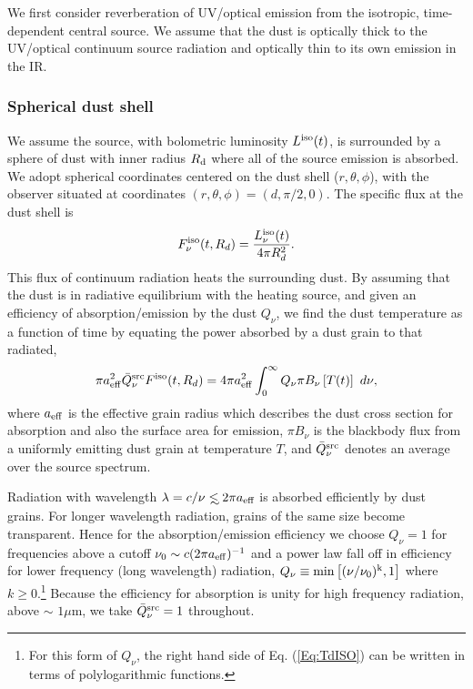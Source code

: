 We first consider reverberation of UV/optical emission from the isotropic,
time-dependent central source. We assume that the dust is optically thick to
the UV/optical continuum source radiation and optically thin to its own
emission in the IR.


\subsubsection{Spherical dust shell}

We assume the source, with bolometric luminosity $L^{\rm iso}(t)$, is
surrounded by a sphere of dust with inner radius $R_{\rm{d}}$ where all of the
source emission is absorbed. We adopt spherical coordinates centered on the
dust shell ($r,\theta,\phi$), with the observer situated at coordinates $(r,
\theta, \phi) = (d, \pi/2, 0)$. The specific flux at the dust shell is
\begin{equation}
F^{\rm iso}_{\nu}(t, R_d) = \frac{L^{\rm iso}_{\nu}(t)}{4 \pi R^2_d}.
\end{equation}
This flux of continuum radiation heats the surrounding dust. By assuming that
the dust is in radiative equilibrium with the heating source, and given an
efficiency of absorption/emission by the dust $Q_{\nu}$, we find the dust
temperature as a function of time by equating the power absorbed by a dust
grain to that radiated,
\begin{eqnarray}
\pi a^2_{\rm{eff}}\bar{Q}^{\rm src}_{\nu} F^{\rm iso}(t, R_d) = 4\pi a^2_{\rm eff} \int^{\infty}_{0}{Q_{\nu} \pi B_{\nu}\left[T(t)\right] \ d \nu } ,
\label{Eq:TdISO}
\end{eqnarray}
where $a_{\rm eff}$ is the effective grain radius which describes the dust
cross section for absorption and also the surface area for emission, $\pi
B_{\nu}$ is the blackbody flux from a uniformly emitting dust grain at
temperature $T$, and $\bar{Q}^{\rm src}_{\nu}$ denotes an average over the
source spectrum.

Radiation with wavelength $\lambda = c/\nu \lsim 2 \pi a_{\eff}$ is absorbed
efficiently by dust grains. For longer wavelength radiation, grains of the
same size become transparent.  Hence for the absorption/emission efficiency we
choose $Q_{\nu}=1$ for frequencies above a cutoff $\nu_0 \sim c (2 \pi
a_{\rm{eff}})^{-1}$ and a power law fall off in efficiency for lower frequency
(long wavelength) radiation, $Q_{\nu} \equiv \rm{min}\left[ (\nu/\nu_0)^k,
1\right]$ where $k \geq 0$.\footnote{ For this form of $Q_{\nu}$, the right
hand side of Eq. (\ref{Eq:TdISO}) can be written in terms of polylogarithmic
functions.}  Because the efficiency for absorption is unity for high frequency
radiation, above $\sim$ $1\mu$m, we take $\bar{Q}^{\rm src}_{\nu} = 1$
throughout.


